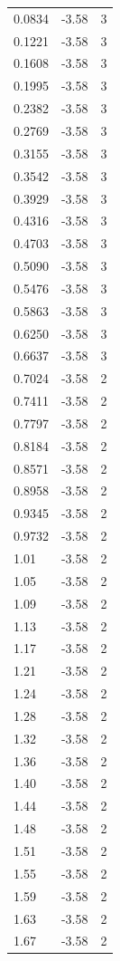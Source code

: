\begin{longtable}{lrr}
  0.0834 & -3.58 & 3 \\
  0.1221 & -3.58 & 3 \\
  0.1608 & -3.58 & 3 \\
  0.1995 & -3.58 & 3 \\
  0.2382 & -3.58 & 3 \\
  0.2769 & -3.58 & 3 \\
  0.3155 & -3.58 & 3 \\
  0.3542 & -3.58 & 3 \\
  0.3929 & -3.58 & 3 \\
  0.4316 & -3.58 & 3 \\
  0.4703 & -3.58 & 3 \\
  0.5090 & -3.58 & 3 \\
  0.5476 & -3.58 & 3 \\
  0.5863 & -3.58 & 3 \\
  0.6250 & -3.58 & 3 \\
  0.6637 & -3.58 & 3 \\
  0.7024 & -3.58 & 2 \\
  0.7411 & -3.58 & 2 \\
  0.7797 & -3.58 & 2 \\
  0.8184 & -3.58 & 2 \\
  0.8571 & -3.58 & 2 \\
  0.8958 & -3.58 & 2 \\
  0.9345 & -3.58 & 2 \\
  0.9732 & -3.58 & 2 \\
  1.01 & -3.58 & 2 \\
  1.05 & -3.58 & 2 \\
  1.09 & -3.58 & 2 \\
  1.13 & -3.58 & 2 \\
  1.17 & -3.58 & 2 \\
  1.21 & -3.58 & 2 \\
  1.24 & -3.58 & 2 \\
  1.28 & -3.58 & 2 \\
  1.32 & -3.58 & 2 \\
  1.36 & -3.58 & 2 \\
  1.40 & -3.58 & 2 \\
  1.44 & -3.58 & 2 \\
  1.48 & -3.58 & 2 \\
  1.51 & -3.58 & 2 \\
  1.55 & -3.58 & 2 \\
  1.59 & -3.58 & 2 \\
  1.63 & -3.58 & 2 \\
  1.67 & -3.58 & 2 \\

\end{longtable}
